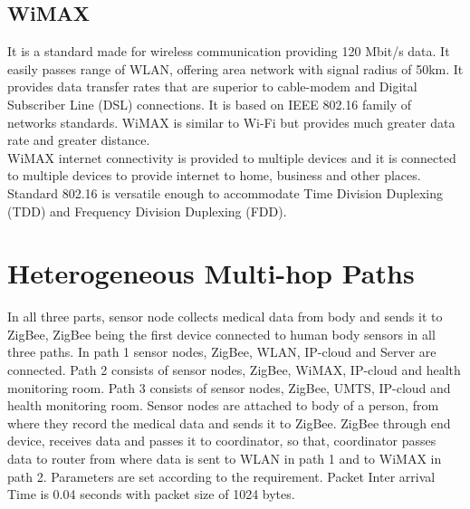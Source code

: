 \documentclass[11pt, conference, compsocconf, onecolumn]{IEEEtran}
\begin{document}
\subsection{WiMAX}
It is a standard made for wireless communication providing 120 Mbit/s data. It easily passes range of WLAN, offering area network with signal radius of 50km. It provides data transfer rates that are superior to cable-modem and Digital Subscriber Line (DSL) connections. It is based on IEEE 802.16 family of networks standards. WiMAX is similar to Wi-Fi but provides much greater data rate and greater distance.
\\
\indent WiMAX internet connectivity is provided to multiple devices and it is connected to multiple devices to provide internet to home, business and other places. Standard 802.16 is versatile enough to accommodate Time Division Duplexing (TDD) and Frequency Division Duplexing (FDD).
\section{Heterogeneous Multi-hop Paths}
In all three parts, sensor node collects medical data from body and sends it to ZigBee, ZigBee being the first device connected to human body sensors in all three paths. In path 1 sensor nodes, ZigBee, WLAN, IP-cloud and Server are connected. Path 2 consists of sensor nodes, ZigBee, WiMAX, IP-cloud and health monitoring room. Path 3 consists of sensor nodes, ZigBee, UMTS, IP-cloud and health monitoring room. Sensor nodes are attached to body of a person, from where they record the medical data and sends it to ZigBee. ZigBee through end device, receives data and passes it to coordinator, so that, coordinator passes data to router from where data is sent to WLAN in path 1 and to WiMAX in path 2. Parameters are set according to the requirement. Packet Inter arrival Time is 0.04 seconds with packet size of 1024 bytes.
\end{document}
